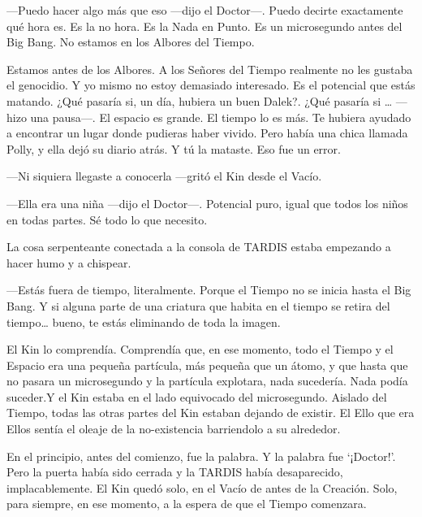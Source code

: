 ---Puedo hacer algo más que eso ---dijo el Doctor---. Puedo decirte exactamente qué hora es. Es la no hora. Es la Nada en Punto. Es un microsegundo antes del Big Bang. No estamos en los Albores del Tiempo.

Estamos antes de los Albores. A los Señores del Tiempo realmente no les gustaba el genocidio. Y yo mismo no estoy demasiado interesado. Es el potencial que estás matando. ¿Qué pasaría si, un día, hubiera un buen Dalek?. ¿Qué pasaría si \ldots{} ---hizo una pausa---. El espacio es grande. El tiempo lo es más. Te hubiera ayudado a encontrar un lugar donde pudieras haber vivido. Pero había una chica llamada Polly, y ella dejó su diario atrás. Y tú la mataste. Eso fue un error.

---Ni siquiera llegaste a conocerla ---gritó el Kin desde el Vacío.

---Ella era una niña ---dijo el Doctor---. Potencial puro, igual que todos los niños en todas partes. Sé todo lo que necesito.

La cosa serpenteante conectada a la consola de TARDIS estaba empezando a hacer humo y a chispear.

---Estás fuera de tiempo, literalmente. Porque el Tiempo no se inicia hasta el Big Bang. Y si alguna parte de una criatura que habita en el tiempo se retira del tiempo\ldots{} bueno, te estás eliminando de toda la imagen.

El Kin lo comprendía. Comprendía que, en ese momento, todo el Tiempo y el Espacio era una pequeña partícula, más pequeña que un átomo, y que hasta que no pasara un microsegundo y la partícula explotara, nada sucedería. Nada podía suceder.Y el Kin estaba en el lado equivocado del microsegundo. Aislado del Tiempo, todas las otras partes del Kin estaban dejando de existir. El Ello que era Ellos sentía el oleaje de la no-existencia barriendolo a su alrededor.

En el principio, antes del comienzo, fue la palabra. Y la palabra fue `¡Doctor!'. Pero la puerta había sido cerrada y la TARDIS había desaparecido, implacablemente. El Kin quedó solo, en el Vacío de antes de la Creación. Solo, para siempre, en ese momento, a la espera de que el Tiempo comenzara.